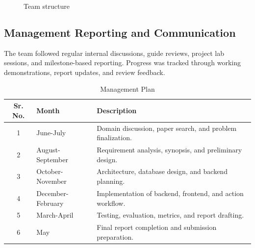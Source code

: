 \begin{figure}[H]
\centering
{}
\caption{Team structure}
\label{fig:team}
\end{figure}

\subsection{Management Reporting and Communication}
The team followed regular internal discussions, guide reviews, project lab sessions, and milestone-based reporting. Progress was tracked through working demonstrations, report updates, and review feedback.

\begin{table}[H]
\centering
\caption{Management Plan}
\def\arraystretch{1.3}
\begin{tabularx}{\textwidth}{|c|l|X|}
\hline
\textbf{Sr. No.} & \textbf{Month} & \textbf{Description} \\ \hline
1 & June-July & Domain discussion, paper search, and problem finalization. \\ \hline
2 & August-September & Requirement analysis, synopsis, and preliminary design. \\ \hline
3 & October-November & Architecture, database design, and backend planning. \\ \hline
4 & December-February & Implementation of backend, frontend, and action workflow. \\ \hline
5 & March-April & Testing, evaluation, metrics, and report drafting. \\ \hline
6 & May & Final report completion and submission preparation. \\ \hline
\end{tabularx}
\end{table}
